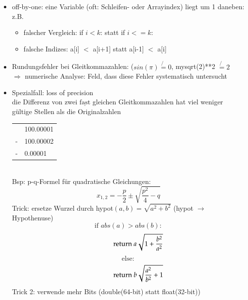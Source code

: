 \documentclass[11pt, fleqn]{scrreprt}
\begin{document}
\begin{itemize}
			\begin{itemize}
			\item off-by-one: eine Variable (oft: Schleifen- oder Arrayindex) liegt um 1 daneben: z.B. 
			\begin{itemize}
			\item falscher Vergleich: if $i<k$: statt if $i <= k$:
			\item falsche Indizes: a[i] $<$ a[i+1] statt a[i-1] $<$ a[i]
			\end{itemize}
			\item Rundungsfehler bei Gleitkommazahlen: ($sin(\pi)\not{=} 0$, mysqrt(2)**2 $\not{=} 2$\\
			$\Rightarrow$ numerische Analyse: Feld, dass diese Fehler systematisch untersucht
			\item Spezialfall: loss of precision \\
			die Differenz von zwei $\underline{\text{fast}}$ gleichen Gleitkommazahlen hat viel weniger gültige Stellen als die Originalzahlen \\
			\begin{tabular}{L{0.5cm} R{2cm}}
			& 100.00001 \\
			- & 100.00002 \\ \hline
			- & 0.00001 \\
			\end{tabular}\\
			
			Bsp: p-q-Formel für quadratische Gleichungen:
			\[x_{1,2} = -\frac{p}{2} \pm \sqrt{\frac{p^2}{4} - q} \] 
			Trick: ersetze Wurzel durch hypot$(a,b) = \sqrt{a^2 + b^2}$ \hspace*{1cm}(hypot $\rightarrow$ Hypothenuse)\\
			\[ \text{if } abs(a) > abs(b):\]
			\[\hspace*{1cm}\text{return } a \sqrt{1 + \frac{b^2}{a^2}}\]
			\[ \text{else}:\]
			\[\hspace*{1cm}\text{return } b \sqrt{\frac{a^2}{b^2} + 1} \]
			Trick 2: verwende mehr Bits (double(64-bit) statt float(32-bit)) \\
			

\end{itemize}
\end{itemize}
\end{document}
